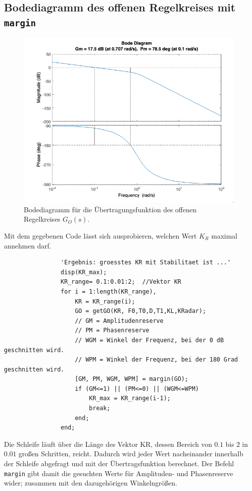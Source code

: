 \documentclass{article}
\begin{document}
		\subsection{Bodediagramm des offenen Regelkreises mit \lstinline{margin}}
			\begin{figure}[h]
			    \includegraphics[scale=0.7, center]{./Bodediagramm_4_f.png}
			    \caption{Bodediagramm für die Übertragungsfunktion des offenen Regelkreises $G_O(s)$.}
			    \label{fig:label}
			\end{figure}
\newpage
			Mit dem gegebenen Code lässt sich ausprobieren, welchen Wert $K_R$ maximal annehmen darf.
			\begin{lstlisting}
				'Ergebnis: groesstes KR mit Stabilitaet ist ...'
				disp(KR_max);
				KR_range= 0.1:0.01:2;  //Vektor KR
				for i = 1:length(KR_range),
				    KR = KR_range(i);
				    GO = getGO(KR, F0,T0,D,T1,KL,KRadar);
				    // GM = Amplitudenreserve
				    // PM = Phasenreserve
				    // WGM = Winkel der Frequenz, bei der 0 dB geschnitten wird.
				    // WPM = Winkel der Frequenz, bei der 180 Grad geschnitten wird.
				    [GM, PM, WGM, WPM] = margin(GO);
				    if (GM<=1) || (PM<=0) || (WGM<=WPM)
				        KR_max = KR_range(i-1);
				        break;
				    end;
				end;
			\end{lstlisting}
			Die Schleife läuft über die Länge des Vektor KR, dessen Bereich von $0.1$ bis $2$ in $0.01$ großen Schritten, reicht. Dadurch wird jeder Wert nacheinander innerhalb der Schleife abgefragt und mit der Übertragsfunktion berechnet. Der Befehl \lstinline{margin} gibt damit die gesuchten Werte für Amplituden- und Phasenreserve wider; zusammen mit den dazugehörigen Winkelngrößen.\\
\end{document}
